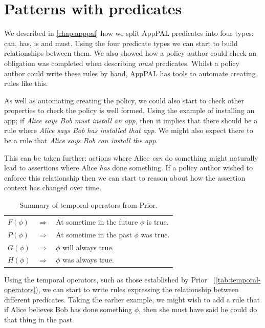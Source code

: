 \documentclass[thesis.tex]{subfiles}
\begin{document}
\section{Patterns with predicates}

We described in \autoref{chap:apppal} how we split AppPAL predicates into four types: can, has, is and must.
Using the four predicate types we can start to build relationships between them.
We also showed how a policy author could check an obligation was completed when
describing \emph{must} predicates.  Whilst a policy author could write these
rules by hand, AppPAL has tools to automate creating rules like this.

As well as automating creating the policy, we could also start to check other
properties to check the policy is well formed. Using the example of installing
an app; if \emph{Alice says Bob must install
  an app}, then it implies that there should be a rule where \emph{Alice says
Bob has installed that app}.  We might also expect there to be a rule that
\emph{Alice says Bob can install the app}.

This can be taken further: actions where Alice \emph{can} do something might
naturally lead to assertions where Alice \emph{has} done something.  If a policy
author wished to enforce this relationship then we can start to reason about how the
assertion context has changed over time.

\begin{table}\centering
 \begin{tabular}{l c l}
   \toprule
     $F(\phi)$ & $\Rightarrow$ & At sometime in the future $\phi$ is true. \\
     $P(\phi)$ & $\Rightarrow$ & At sometime in the past $\phi$ was true. \\
     $G(\phi)$ & $\Rightarrow$ & $\phi$ will always true. \\
     $H(\phi)$ & $\Rightarrow$ & $\phi$ was always true. \\
   \bottomrule
 \end{tabular}
 \caption{Summary of temporal operators from Prior.}
 \label{tab:temporal-operators}
\end{table}

Using the temporal operators, such as those established by
Prior~\cite{arthur_n._prior_past_1967} (\autoref{tab:temporal-operators}), we can
start to write rules expressing the relationship between different predicates.
Taking the earlier example, we might wish to add a rule that if Alice believes
Bob has done something $\phi$, then she must have said he could do that thing in
the past.
\end{document}
